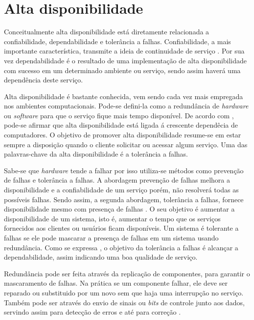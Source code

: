 \chapter{Alta disponibilidade}
Conceitualmente alta disponibilidade está diretamente relacionada a confiabilidade, dependabilidade e tolerância a falhas. 
Confiabilidade, a mais importante característica, transmite a ideia de continuidade de serviço \cite{pankaj1994}.
Por sua vez dependabilidade é o resultado de uma implementação de alta disponibilidade com sucesso em um determinado ambiente ou serviço,
sendo assim haverá uma dependência deste serviço.

Alta disponibilidade é bastante conhecida, vem sendo cada vez mais empregada nos ambientes computacionais.
Pode-se defini-la como a redundância de \textit{hardware} ou \textit{software} para que o serviço fique mais tempo disponível.
De acordo com \cite{costa2009}, pode-se afirmar que alta disponibilidade está ligada á crescente dependêcia de computadores.
O objetivo de promover alta disponibilidade resume-se em estar sempre a disposição quando o cliente solicitar ou acessar algum serviço.
Uma das palavras-chave da alta disponibilidade é a tolerância a falhas.

Sabe-se que \textit{hardware} tende a falhar por isso utiliza-se métodos como prevenção de falhas e tolerância a falhas.
A abordagem prevenção de falhas melhora a disponibilidade e a confiabilidade de um serviço porém, não resolverá todas as possíveis falhas.
Sendo assim, a segunda abordagem, tolerância a falhas, fornece disponibilidade mesmo com presença de falhas \cite{pankaj1994}.
O seu objetivo é aumentar a disponibilidade de um sistema, isto é, 
aumentar o tempo que os serviços fornecidos aos clientes ou usuários ficam disponíveis. 
Um sistema é tolerante a falhas se ele pode mascarar a presença de falhas em um sistema usando redundância. Como se expressa \cite{costa2009}, 
o objetivo da tolerância a falhas é alcançar a dependabilidade, assim indicando uma boa qualidade de serviço.

Redundância pode ser feita através da replicação de componentes, para garantir o mascaramento de falhas.
Na prática se um componente falhar, ele deve ser reparado ou substituido por um novo sem que haja uma interrupção no serviço.
Também pode ser através do envio de sinais ou \textit{bits} de controle junto aos dados, 
servindo assim para detecção de erros e até para correção \cite{weber2002}.

